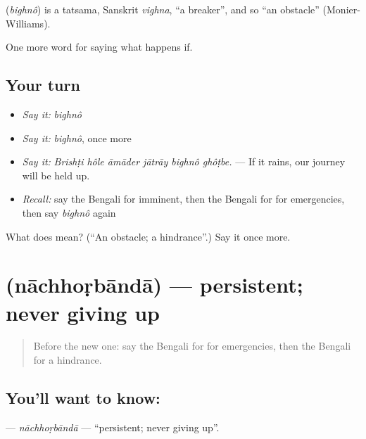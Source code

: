 \begin{cousinweb}
\textbf{} (\emph{bighnô}) is a tatsama, Sanskrit \emph{vighna}, \textquotedblleft{}a breaker\textquotedblright{}, and so \textquotedblleft{}an obstacle\textquotedblright{} (Monier-Williams).
\end{cousinweb}

\begin{grammarlens}[title={What you've built}]
One more word for saying what happens if.
\end{grammarlens}

\subsection*{Your turn}
\begin{itemize}
\raggedright
  \item \emph{Say it:} \emph{bighnô}
  \item \emph{Say it:} \emph{bighnô}, once more
  \item \emph{Say it:} \emph{Brishṭi hôle āmāder jātrāy bighnô ghôṭbe.} — If it rains, our journey will be held up.
  \item \emph{Recall:} say the Bengali for imminent, then the Bengali for for emergencies, then say \emph{bighnô} again
\end{itemize}

\begin{tcolorbox}[breakable,colback=teal!4,colframe=teal!35!black,title={Before you move on}]
What does  mean? (\textquotedblleft{}An obstacle; a hindrance\textquotedblright{}.) Say it once more.
\end{tcolorbox}
\section[\texorpdfstring{\bn{নাছোড়বান্দা} (nāchhoṛbāndā)}{নাছোড়বান্দা (nāchhoṛbāndā)}]{ (nāchhoṛbāndā) — persistent; never giving up}

\label{lesson:BN-C539-nachhorbanda}



\begin{quote}
Before the new one: say the Bengali for for emergencies, then the Bengali for a hindrance.
\end{quote}

\subsection*{You'll want to know: }
\textbf{} — \emph{nāchhoṛbāndā} — \textquotedblleft{}persistent; never giving up\textquotedblright{}.

